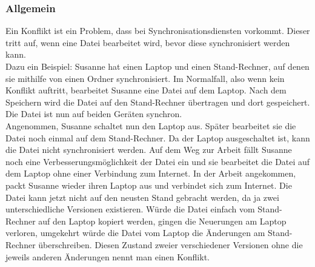 \subsubsection{Allgemein}
Ein Konflikt ist ein Problem, dass bei Synchronisationsdiensten vorkommt. Dieser tritt auf, wenn eine Datei bearbeitet wird, bevor diese synchronisiert werden kann. \\
Dazu ein Beispiel: Susanne hat einen Laptop und einen Stand-Rechner, auf denen sie mithilfe von \sblit einen Ordner synchronisiert. Im Normalfall, also wenn kein Konflikt auftritt, bearbeitet Susanne eine Datei auf dem Laptop. Nach dem Speichern wird die Datei auf den Stand-Rechner übertragen und dort gespeichert. Die Datei ist nun auf beiden Geräten synchron.\\
Angenommen, Susanne schaltet nun den Laptop aus. Später bearbeitet sie die Datei noch einmal auf dem Stand-Rechner. Da der Laptop ausgeschaltet ist, kann die Datei nicht synchronisiert werden. Auf dem Weg zur Arbeit fällt Susanne noch eine Verbesserungsmöglichkeit der Datei ein und sie bearbeitet die Datei auf dem Laptop ohne einer Verbindung zum Internet. In der Arbeit angekommen, packt Susanne wieder ihren Laptop aus und verbindet sich zum Internet. Die Datei kann jetzt nicht auf den neusten Stand gebracht werden, da ja zwei unterschiedliche Versionen existieren. Würde die Datei einfach vom Stand-Rechner auf den Laptop kopiert werden, gingen die Neuerungen am Laptop verloren, umgekehrt würde die Datei vom Laptop die Änderungen am Stand-Rechner überschreiben. Diesen Zustand zweier verschiedener Versionen ohne die jeweils anderen Änderungen nennt man einen Konflikt.

